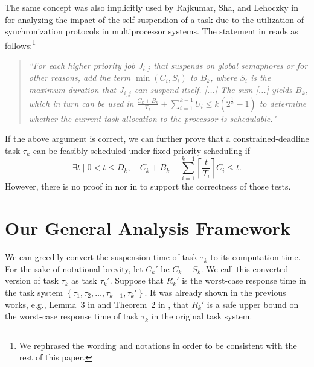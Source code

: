\documentclass[10pt,conference,preprint]{IEEEtran}
\newcommand{\ceiling}[1]{\left\lceil{#1}\right\rceil}
\newcommand{\setof}[1]{\left\{{#1}\right\}}
\def\myendproof{{\ \vbox{\hrule\hbox{%
   \vrule height1.3ex\hskip0.8ex\vrule}\hrule }}\par}
\renewenvironment{proof}{\noindent{\bf Proof. }}{\myendproof}
\newtheorem{Lemma}{Lemma}
\begin{document}
The same concept was also implicitly used by Rajkumar, Sha, and Lehoczky in~\cite[p. 267]{DBLP:conf/rtss/RajkumarSL88} for analyzing the impact of the self-suspendion of a task due to the utilization of synchronization protocols in multiprocessor systems. The statement in \cite{DBLP:conf/rtss/RajkumarSL88} reads as follows:\footnote{We rephrased the wording and notations in order to be consistent with the rest of this paper.}
\begin{quote}
\emph{``For each higher priority job $J_{i,j}$ that suspends on global semaphores or for other reasons, add the term $\min(C_i, S_i)$ to $B_k$, where $S_i$ is the maximum duration that $J_{i,j}$ can suspend itself. [...] The sum [...] yields $B_k$, which in turn can be used in 
$\frac{C_k+B_k}{T_k} + \sum_{i=1}^{k-1} U_i \leq k (2^{\frac{1}{k}}-1)$ to determine whether the current task allocation to the processor is schedulable."}
\end{quote}
  
If the above argument is correct, we can further prove that a constrained-deadline task $\tau_k$ can be feasibly scheduled under fixed-priority scheduling if
\begin{equation}
\label{eq:TDA-suspension}
\exists t \mid 0 < t \leq D_k, \quad C_k + B_k + \sum_{i=1}^{k-1}\ceiling{\frac{t}{T_i}} C_i \leq t.
\end{equation}
However, there is no proof in
\cite{Liu:2000:RS:518501} nor in \cite{DBLP:conf/rtss/RajkumarSL88} to support the correctness of those tests. 


%



\section{Our General Analysis Framework}
\label{sec:analysis}

We can greedily convert the suspension time of task $\tau_k$ to its
computation time. For the sake of notational brevity, let $C_k'$ be
$C_k + S_k$. We call this converted version of task $\tau_k$ as task
$\tau_k'$.  Suppose that $R_k'$ is the worst-case response time in the
task system $\setof{\tau_1, \tau_2, \ldots, \tau_{k-1}, \tau_k'}$. It
was already shown in the previous works, e.g., Lemma~3 in
\cite{Liu_2014} and Theorem~2 in \cite{ecrts15nelissen}, that $R_k'$
is a safe upper bound on the worst-case response time of task $\tau_k$
in the original task system.
\end{document}
